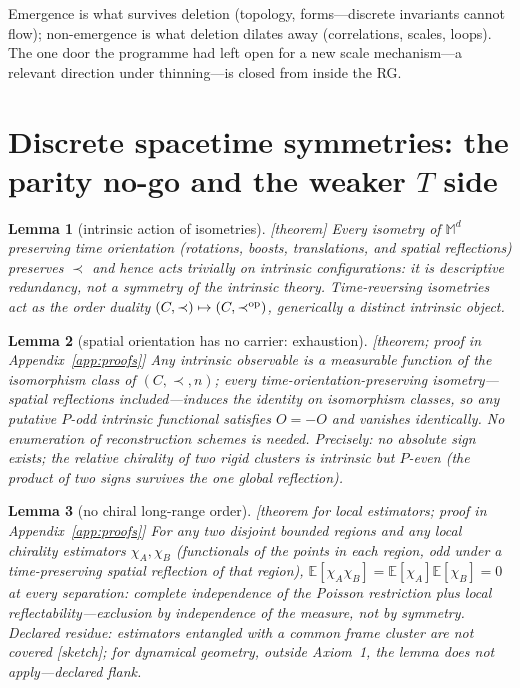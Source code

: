 \documentclass[aps,prd,reprint,nofootinbib,superscriptaddress,floatfix]{revtex4-2}
\newtheorem{lemma}{Lemma}
\theoremstyle{definition}
\begin{document}
Emergence is what survives deletion (topology, forms---discrete invariants cannot
flow); non-emergence is what deletion dilates away (correlations, scales, loops). The
one door the programme had left open for a new scale mechanism---a relevant direction
under thinning---is closed from inside the RG.

\section{Discrete spacetime symmetries: the parity no-go and the weaker $T$ side}
\label{sec:parity}

\begin{lemma}[intrinsic action of isometries]
\label{lem:isometries}
{\rm[theorem]} Every isometry of $\mathbb{M}^d$ preserving time orientation (rotations,
boosts, translations, \emph{and spatial reflections}) preserves $\prec$ and hence acts
\emph{trivially} on intrinsic configurations: it is descriptive redundancy, not a
symmetry of the intrinsic theory. Time-reversing isometries act as the \emph{order
duality} $(C,\prec)\mapsto(C,\prec^{\rm op})$, generically a distinct intrinsic object.
\end{lemma}

\begin{lemma}[spatial orientation has no carrier: exhaustion]
\label{lem:gram}
{\rm[theorem; proof in Appendix~\ref{app:proofs}]} Any intrinsic observable is a
measurable function of the isomorphism class of $(C,\prec,n)$; every
time-orientation-preserving isometry---spatial reflections included---induces the
\emph{identity} on isomorphism classes, so any putative $P$-odd intrinsic functional
satisfies $O=-O$ and vanishes identically. No enumeration of reconstruction schemes is
needed. Precisely: no \emph{absolute} sign exists; the \emph{relative} chirality of two
rigid clusters is intrinsic but $P$-\emph{even} (the product of two signs survives the
one global reflection).
\end{lemma}

\begin{lemma}[no chiral long-range order]
\label{lem:quenched}
{\rm[theorem for local estimators; proof in Appendix~\ref{app:proofs}]} For any two
disjoint bounded regions and any local chirality estimators $\chi_A,\chi_B$ (functionals
of the points in each region, odd under a time-preserving spatial reflection of that
region), $\mathbb{E}[\chi_A\chi_B]=\mathbb{E}[\chi_A]\mathbb{E}[\chi_B]=0$ at
\emph{every} separation: complete independence of the Poisson restriction plus local
reflectability---exclusion by \emph{independence of the measure}, not by symmetry.
Declared residue: estimators entangled with a common frame cluster are not covered
[sketch]; for dynamical geometry, outside Axiom~1, the lemma does not apply---declared
flank.
\end{lemma}
\end{document}
